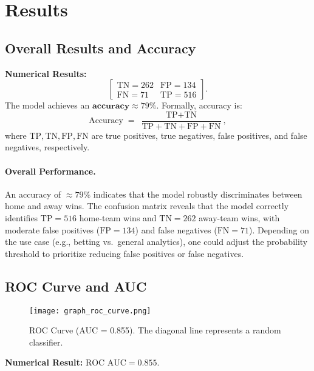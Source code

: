 \documentclass[12pt]{article}
\begin{document}
\section{Results}
\subsection{Overall Results and Accuracy}

\noindent
\textbf{Numerical Results:}
\[
\begin{bmatrix}
\text{TN} = 262 & \text{FP} = 134 \\
\text{FN} = 71  & \text{TP} = 516
\end{bmatrix}.
\]
The model achieves an \(\textbf{accuracy} \approx 79\%\). Formally, accuracy is:
\[
\text{Accuracy} \;=\; \frac{\text{TP} + \text{TN}}{\text{TP} + \text{TN} + \text{FP} + \text{FN}},
\]
where \(\text{TP}, \text{TN}, \text{FP}, \text{FN}\) are true positives, true negatives, false positives, and false negatives, respectively.

\paragraph{Overall Performance.}
An accuracy of \(\approx 79\%\) indicates that the model robustly discriminates between home and away wins. The confusion matrix reveals that the model correctly identifies \(\text{TP} = 516\) home-team wins and \(\text{TN} = 262\) away-team wins, with moderate false positives (\(\text{FP} = 134\)) and false negatives (\(\text{FN} = 71\)). Depending on the use case (e.g., betting vs.\ general analytics), one could adjust the probability threshold to prioritize reducing false positives or false negatives.

\subsection{ROC Curve and AUC}

\begin{figure}[H]
\centering
\texttt{[image: graph\_roc\_curve.png]}
\caption{ROC Curve (AUC = 0.855). The diagonal line represents a random classifier.}
\label{fig:roc_curve}
\end{figure}

\noindent
\textbf{Numerical Result:} \(\text{ROC AUC} = 0.855.\)
\end{document}
